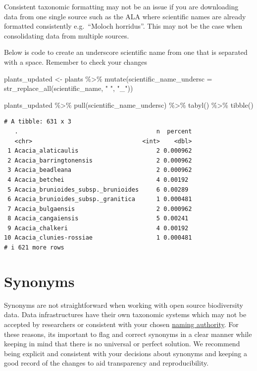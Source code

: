 \documentclass[
  letterpaper,
  DIV=11,
  numbers=noendperiod,
  oneside]{scrreprt}
\newenvironment{Shaded}{\begin{snugshade}}{\end{snugshade}}
\newcommand{\AttributeTok}[1]{\textcolor[rgb]{0.40,0.45,0.13}{#1}}
\newcommand{\FunctionTok}[1]{\textcolor[rgb]{0.28,0.35,0.67}{#1}}
\newcommand{\NormalTok}[1]{\textcolor[rgb]{0.00,0.23,0.31}{#1}}
\newcommand{\OtherTok}[1]{\textcolor[rgb]{0.00,0.23,0.31}{#1}}
\newcommand{\SpecialCharTok}[1]{\textcolor[rgb]{0.37,0.37,0.37}{#1}}
\newcommand{\StringTok}[1]{\textcolor[rgb]{0.13,0.47,0.30}{#1}}
\begin{document}
Consistent taxonomic formatting may not be an issue if you are
downloading data from one single source such as the ALA where scientific
names are already formatted consistently e.g.~``Moloch horridus''. This
may not be the case when consolidating data from multiple sources.

Below is code to create an underscore scientific name from one that is
separated with a space. Remember to check your changes

\begin{Shaded}
\begin{Highlighting}[]
\NormalTok{plants\_updated }\OtherTok{\textless{}{-}}\NormalTok{ plants }\SpecialCharTok{\%\textgreater{}\%} 
  \FunctionTok{mutate}\NormalTok{(}\AttributeTok{scientific\_name\_undersc =} \FunctionTok{str\_replace\_all}\NormalTok{(scientific\_name, }\StringTok{" "}\NormalTok{, }\StringTok{"\_"}\NormalTok{)) }

\NormalTok{plants\_updated }\SpecialCharTok{\%\textgreater{}\%} 
  \FunctionTok{pull}\NormalTok{(scientific\_name\_undersc) }\SpecialCharTok{\%\textgreater{}\%} 
  \FunctionTok{tabyl}\NormalTok{() }\SpecialCharTok{\%\textgreater{}\%} 
  \FunctionTok{tibble}\NormalTok{()}
\end{Highlighting}
\end{Shaded}

\begin{verbatim}
# A tibble: 631 x 3
   .                                       n  percent
   <chr>                               <int>    <dbl>
 1 Acacia_alaticaulis                      2 0.000962
 2 Acacia_barringtonensis                  2 0.000962
 3 Acacia_beadleana                        2 0.000962
 4 Acacia_betchei                          4 0.00192 
 5 Acacia_brunioides_subsp._brunioides     6 0.00289 
 6 Acacia_brunioides_subsp._granitica      1 0.000481
 7 Acacia_bulgaensis                       2 0.000962
 8 Acacia_cangaiensis                      5 0.00241 
 9 Acacia_chalkeri                         4 0.00192 
10 Acacia_clunies-rossiae                  1 0.000481
# i 621 more rows
\end{verbatim}

\hypertarget{synonyms}{%
\section{Synonyms}\label{synonyms}}

Synonyms are not straightforward when working with open source
biodiversity data. Data infrastructures have their own taxonomic systems
which may not be accepted by researchers or consistent with your chosen
\href{link_back}{naming authority}. For these reasons, its important to
flag and correct synonyms in a clear manner while keeping in mind that
there is no universal or perfect solution. We recommend being explicit
and consistent with your decisions about synonyms and keeping a good
record of the changes to aid transparency and reproducibility.
\end{document}
